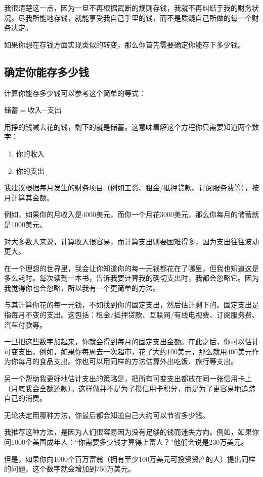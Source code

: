 我很清楚这一点，因为一旦不再根据武断的规则存钱，我就不再纠结于我的财务状况。尽我所能地存钱，就能享受我自己手里的钱，而不是质疑自己所做的每一个财务决定。

如果你想在存钱方面实现类似的转变，那么你首先需要确定你能存下多少钱。

\subsection{确定你能存多少钱}
计算你能存多少钱可以参考这个简单的等式：

储蓄$=$收入$-$支出

用挣的钱减去花的钱，剩下的就是储蓄。这意味着解这个方程你只需要知道两个数字：

\begin{enumerate}
\item 你的收入
\item 你的支出
\end{enumerate}
我建议根据每月发生的财务项目（例如工资、租金/抵押贷款、订阅服务费等），按月计算其金额。

例如，如果你的月收入是4000美元，而你一个月花3000美元，那么你每月的储蓄就是1000美元。

对大多数人来说，计算收入很容易，而计算支出则要困难得多，因为支出往往波动更大。

在一个理想的世界里，我会让你知道你的每一元钱都花在了哪里，但我也知道这是多么耗时。每次读到一本书，告诉我要计算我的确切支出时，我都会忽略它。因为我觉得你也会忽略，所以我有一个更简单的方法。

与其计算你花的每一元钱，不如找到你的固定支出，然后估计剩下的。固定支出是指每月不变的支出。这包括：租金/抵押贷款、互联网/有线电视费、订阅服务费、汽车付款等。

一旦把这些数字加起来，你就会得到每月的固定支出金额。在此之后，你可以估计可变支出。例如，如果你每周去一次超市，花了大约100美元，那么就用400美元作为你每月的食品支出。你也可以用同样的方法估算外出吃饭、旅行等支出。

另一个帮助我更好地估计支出的策略是，把所有可变支出都放在同一张信用卡上（月底我会全额还款）。这样做并不是为了攒信用卡积分，而是为了更容易地追踪自己的消费。

无论决定用哪种方法，你最后都会知道自己大约可以节省多少钱。

我推荐这种方法，是因为人们很容易因为没有足够的钱而迷失方向。例如，如果你问1000个美国成年人：“你需要多少钱才算得上富人？”他们会说是230万美元。

但是，如果你向1000个百万富翁（拥有至少100万美元可投资资产的人）提出同样的问题，这个数字就会增加到750万美元。

